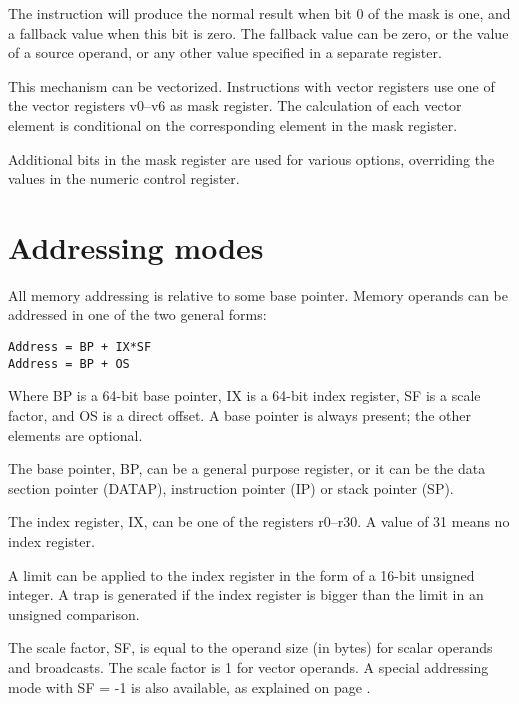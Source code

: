 \documentclass[forwardcom.tex]{subfiles}
\begin{document}
The instruction will produce the normal result when bit 0 of the mask is one, and a fallback value when this bit is zero. The fallback value can be zero, or the value of a source operand, or any other value specified in a separate register.
\vspace{2mm}

This mechanism can be vectorized. Instructions with vector registers use one of the vector registers v0--v6 as mask register. The calculation of each vector element is conditional on the corresponding element in the mask register.
\vspace{2mm}

Additional bits in the mask register are used for various options, overriding the values in the numeric control register.

\section{Addressing modes}
All memory addressing is relative to some base pointer. Memory operands can be addressed in one of the two general forms:

\begin{lstlisting}
Address = BP + IX*SF
Address = BP + OS
\end{lstlisting}

Where BP is a 64-bit base pointer, IX is a 64-bit index register, SF is a scale factor, and OS is a direct offset. A base pointer is always present; the other elements are optional. 
\vspace{2mm}

The base pointer, BP, can be a general purpose register, or it can be the data section pointer (DATAP), instruction pointer (IP) or stack pointer (SP).
\vspace{2mm}

The index register, IX, can be one of the registers r0--r30. A value of 31 means no index register.
\vspace{2mm}

A limit can be applied to the index register in the form of a 16-bit unsigned integer. A trap is generated if the index register is bigger than the limit in an unsigned comparison.
\vspace{2mm}

The scale factor, SF, is equal to the operand size (in bytes) for scalar operands and broadcasts. The scale factor is 1 for vector operands. A special addressing mode with 
SF = -1 
is also available, as explained on page \pageref{vectorLoops}.
\vspace{2mm}
\end{document}
